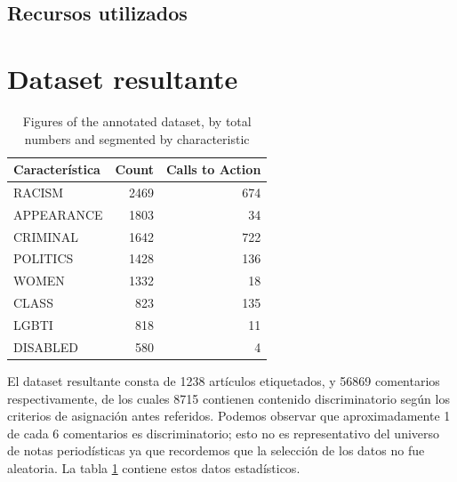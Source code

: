 \subsection{Recursos utilizados}

\section{Dataset resultante}

\begin{table}
    \centering
    \begin{tabular}{lrr}
        \toprule
        Característica &  Count &  Calls to Action \\
        \midrule
        RACISM         &   2469 &              674 \\
        APPEARANCE     &   1803 &               34 \\
        CRIMINAL       &   1642 &              722 \\
        POLITICS       &   1428 &              136 \\
        WOMEN          &   1332 &               18 \\
        CLASS          &    823 &              135 \\
        LGBTI          &    818 &               11 \\
        DISABLED       &    580 &                4 \\
        \bottomrule
    \end{tabular}
    \caption{Figures of the annotated dataset, by total numbers and segmented by characteristic}
    \label{tab:dataset_figures}

\end{table}

El dataset resultante consta de 1238 artículos etiquetados, y 56869 comentarios respectivamente, de los cuales 8715 contienen contenido discriminatorio según los criterios de asignación antes referidos. Podemos observar que aproximadamente 1 de cada 6 comentarios es discriminatorio; esto no es representativo del universo de notas periodísticas ya que recordemos que la selección de los datos no fue aleatoria. La tabla \ref{tab:dataset_figures} contiene estos datos estadísticos.

